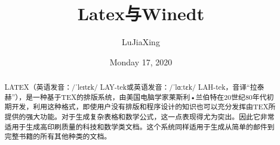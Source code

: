 \documentclass[UTF8]{ctexart}
\begin{document}
 
\title{Latex与Winedt}
\author{LuJiaXing}
\date{Monday 17, 2020}
\maketitle
 
\begin{abstract}
LATEX（英语发音：/ˈleɪtɛk/ LAY-tek或英语发音：/ˈlɑːtɛk/ LAH-tek，音译“拉泰赫”），是一种基于TEX的排版系统，由美国电脑学家莱斯利•兰伯特在20世纪80年代初期开发，利用这种格式，即使用户没有排版和程序设计的知识也可以充分发挥由TEX所提供的强大功能。对于生成复杂表格和数学公式，这一点表现得尤为突出。因此它非常适用于生成高印刷质量的科技和数学类文档。这个系统同样适用于生成从简单的邮件到完整书籍的所有其他种类的文档。
\end{abstract}
 
\end{document}
